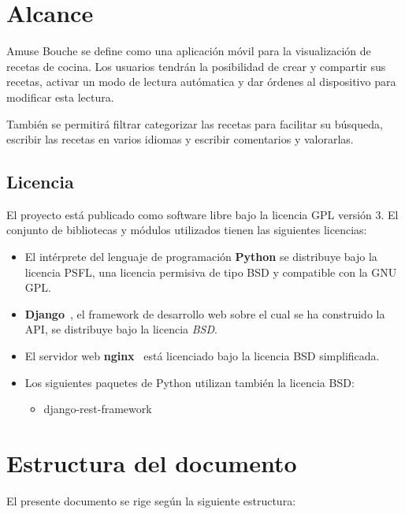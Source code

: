 \section{Alcance}

Amuse Bouche se define como una aplicación móvil para la visualización de
recetas de cocina. Los usuarios tendrán la posibilidad de crear y compartir
sus recetas, activar un modo de lectura autómatica y dar órdenes al dispositivo
para modificar esta lectura.

También se permitirá filtrar categorizar las recetas para facilitar su búsqueda,
escribir las recetas en varios idiomas y escribir comentarios y valorarlas.


\subsection{Licencia}
El proyecto está publicado como software libre bajo la licencia
\ac{GPL} versión 3. El conjunto de bibliotecas y módulos utilizados
tienen las siguientes licencias:

\begin{itemize}
\item El intérprete del lenguaje de programación \textbf{Python} se distribuye
  bajo la licencia \ac{PSFL}, una licencia permisiva de tipo \ac{BSD} y
  compatible con la \ac{GNU} \ac{GPL}.

\item \textbf{Django}~\cite{django}, el framework de desarrollo web sobre el
  cual se ha construido la API, se distribuye bajo la licencia \textit{\ac{BSD}}.

\item El servidor web \textbf{nginx}~\cite{nginx} está licenciado bajo la
  licencia \ac{BSD} simplificada.

\item Los siguientes paquetes de Python utilizan también la licencia \ac{BSD}:
  \begin{itemize}
  \item django-rest-framework
  \end{itemize}
\end{itemize}



\section{Estructura del documento}
El presente documento se rige según la siguiente estructura:

